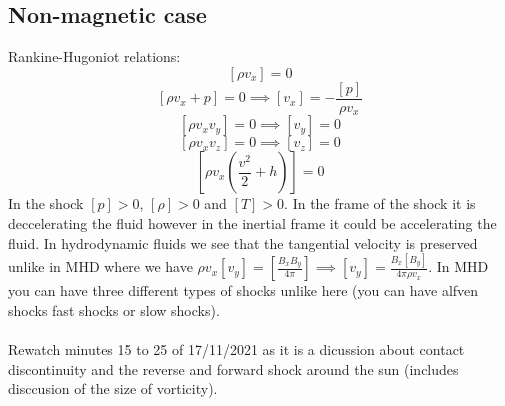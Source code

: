 \documentclass{article}
\begin{document}
        \subsection{Non-magnetic case}
        Rankine-Hugoniot relations:\\
        $$
        [\rho v_x] = 0
        $$
        $$
        [\rho v_x + p] = 0 \implies [ v_x]  = -\frac{[p]}{\rho v_x}
        $$
        $$
        [\rho v_x v_y] = 0 \implies [v_y] = 0
        $$
        $$
        [\rho v_x v_z] = 0 \implies [v_z] = 0
        $$
        $$
        [\rho v_x (\frac{v^2}{2} + h)] = 0
        $$
        In the shock $[p]> 0$, $[\rho] >0$ and $[T] >0$. In the frame of the shock it is deccelerating the fluid however in the inertial frame it could be accelerating the fluid. In hydrodynamic fluids we see that the tangential velocity is preserved unlike in MHD where we have $\rho v_x [v_y] = [\frac{B_x B_y}{4 \pi}] \implies [v_y] = \frac{B_x[B_y]}{4\pi \rho v_x}$. In MHD you can have three different types of shocks unlike here (you can have alfven shocks fast shocks or slow shocks).\\\\
        Rewatch minutes 15 to 25 of 17/11/2021 as it is a dicussion about contact discontinuity and the reverse and forward shock around the sun (includes disccusion of the size of vorticity).
\end{document}
